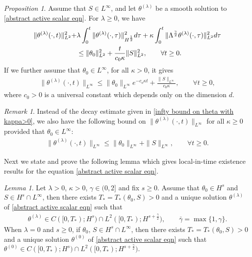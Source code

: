 \documentclass[reqno]{amsart}%
\theoremstyle{definition}
\theoremstyle{remark}
\numberwithin{equation}{section}
\newtheorem{lemma}[theorem]{Lemma}
\newtheorem{proposition}[theorem]{Proposition}
\newtheorem{remark}[theorem]{Remark}
\newcommand{\1}{\mathbf{1}}
\numberwithin{equation}{section}
\numberwithin{theorem}{section}
\numberwithin{figure}{section}
\begin{document}
\begin{proposition}\label{boundedness on theta with kappa>0 prop}
Assume that $S\in L^\infty$, and let $\theta^{(\lambda)}$ be a smooth solution to \eqref{abstract active scalar eqn}. For $\lambda\ge0$, we have
\begin{align}\label{energy inequality kappa>0}
\|\theta^{(\lambda)}(\cdot,t)\|^2_{L^2}+&\lambda\int_0^t\|\theta^{(\lambda)}(\cdot,\tau)\|^2_{H^\frac{1}{2}}d\tau+\kappa\int_0^t\|\Lambda^\frac{\gamma}{2}\theta^{(\lambda)}(\cdot,\tau)\|^2_{L^2}d\tau\notag\\
&\le\|\theta_0\|^2_{L^2}+\frac{t}{c_0\kappa}\|S\|^2_{L^2}, \qquad\forall t\ge0.
\end{align}
If we further assume that $\theta_0\in L^\infty$, for all $\kappa>0$, it gives
\begin{align}\label{infty bound on theta with kappa>0}
\|\theta^{(\lambda)}(\cdot,t)\|_{L^\infty}\le\|\theta_0\|_{L^\infty}e^{-c_o\kappa t}+\frac{\|S\|_{L^\infty}}{c_0\kappa}, \qquad\forall t\ge0,
\end{align}
where $c_0>0$ is a universal constant which depends only on the dimension $d$.
\end{proposition}

\begin{remark}
Instead of the decay estimate given in \eqref{infty bound on theta with kappa>0}, we also have the following bound on $\|\theta^{(\lambda)}(\cdot,t)\|_{L^\infty}$ for all $\kappa\ge0$ provided that $\theta_0\in L^\infty$:
\begin{align}\label{infty bound on theta with kappa=0 or >0}
\|\theta^{(\lambda)}(\cdot,t)\|_{L^\infty}\le \|\theta_0\|_{L^\infty}+\|S\|_{L^\infty},\qquad\forall t\ge0.
\end{align} 
\end{remark}

Next we state and prove the following lemma which gives local-in-time existence results for the equation \eqref{abstract active scalar eqn}. 

\begin{lemma}\label{local-in-time existence lemma}
Let $\lambda>0$, $\kappa>0$, $\gamma\in(0,2]$ and fix $s \ge 0$. Assume that $\theta_0\in H^s$ and $S\in H^s\cap L^\infty$, then there exists $T_*=T_*(\theta_0,S)>0$ and a unique solution $\theta^{(\lambda)}$ of \eqref{abstract active scalar eqn} such that
\begin{align*}
\theta^{(\lambda)}\in C([0,T_*);H^s)\cap L^2([0,T_*);H^{s+\frac{\bar{\gamma}}{2}}),\qquad \bar\gamma=\max\{1,\gamma\}.
\end{align*}
When $\lambda=0$ and $s \ge 0$, if $\theta_0$, $S\in H^s\cap L^\infty$, then there exists $T_*=T_*(\theta_0,S)>0$ and a unique solution $\theta^{(0)}$ of \eqref{abstract active scalar eqn} such that $\theta^{(0)}\in C([0,T_*);H^s)\cap L^2([0,T_*);H^{s+\frac{\gamma}{2}})$.
\end{lemma}
\end{document}
